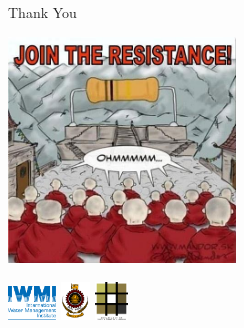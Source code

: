 \documentclass[xcolor=dvipsnames,beamer,unknownkeysallowed]{beamer} %
\begin{document}
\begin{frame}[fragile]{Thank You}

\begin{center}
 \includegraphics[height=6cm]{ohm}
\end{center}

\begin{flushright}
 \includegraphics[height=0.9cm]{iwmi}
 \hspace{5mm}
 \includegraphics[height=1cm]{uoMoratuwa}
 \hspace{5mm}
 \includegraphics[height=1cm]{uoMoratuwa_foa}
\end{flushright}

\end{frame}
\end{document}
